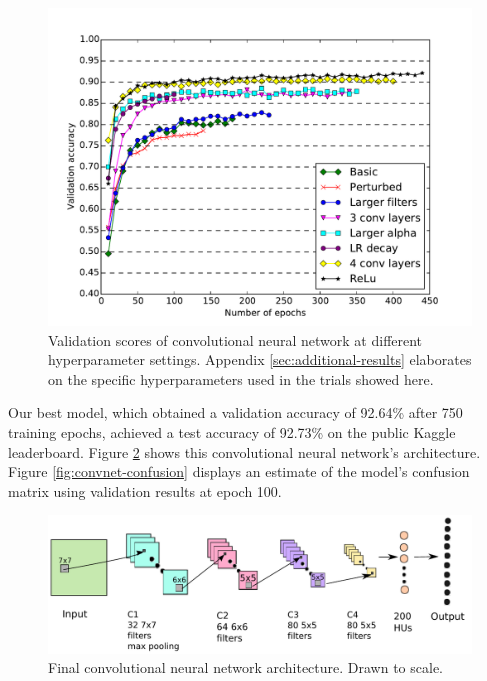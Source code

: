 \documentclass{acm_proc_article-sp}
\begin{document}
\begin{figure}[h!]
	\centering
	\includegraphics[width=\linewidth]{convnet_comparison}
  	\caption{Validation scores of convolutional neural network at different hyperparameter settings. Appendix \ref{sec:additional-results} elaborates on the specific hyperparameters used in the trials showed here.}
  	\label{fig:convnet-compare}
\end{figure}

Our best model, which obtained a validation accuracy of 92.64\% after 750 training epochs, achieved a test accuracy of 92.73\% on the public Kaggle leaderboard. Figure \ref{fig:convnet-architect} shows this convolutional neural network's architecture. Figure \ref{fig:convnet-confusion} displays an estimate of the model's confusion matrix using validation results at epoch 100.

 \begin{figure}[t]
	\centering
	\includegraphics[width=\linewidth]{architecture.pdf}
  	\caption{Final convolutional neural network architecture. Drawn to scale.}
  	\label{fig:convnet-architect}
\end{figure}
\end{document}
